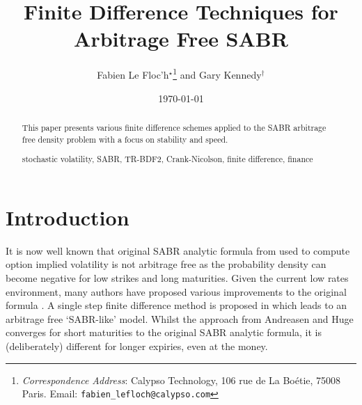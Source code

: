 \documentclass[]{rAMF2e}
\begin{document}
\doi{}
\issn{}  \issnp{}
\def\jobtag{}
\jname{}


\title{Finite Difference Techniques for Arbitrage Free SABR}
\author{Fabien {Le Floc'h}$^\star$\thanks{{\em{Correspondence Address}}: Calypso Technology, 106 rue de La Bo\'{e}tie, 75008 Paris. Email: \texttt{fabien\_lefloch@calypso.com} \vspace{6pt}} and Gary Kennedy$^\dag$}
%
\date{\today}

\maketitle
\newcommand{\sgn}{\mathop{\mathrm{sgn}}}
\begin{abstract}
This paper presents various finite difference schemes applied to the SABR arbitrage free density problem with a focus on stability and speed.
\begin{keywords}stochastic volatility, SABR, TR-BDF2, Crank-Nicolson, finite difference, finance\end{keywords}
\end{abstract}

\section{Introduction}
It is now well known that original SABR analytic formula from \citep{hagan2002managing} used to compute option implied volatility is not arbitrage free as the probability density can become negative for low strikes and long maturities. Given the current low rates environment, many authors have proposed various improvements to the original formula \citep{obloj2008fine, johnson2009arbitrage, paulot2009asymptotic, benaim2008arbitrage}.  A single step finite difference method is proposed in \citep{andreasen2011zabr} which leads to an arbitrage free `SABR-like' model. Whilst the approach from Andreasen and Huge converges for short maturities to the original SABR analytic formula, it is (deliberately) different for longer expiries, even at the money.
\end{document}

